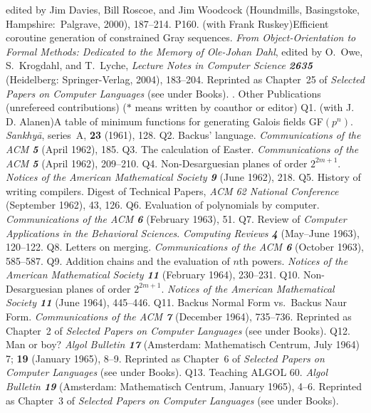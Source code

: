  edited by Jim Davies, Bill Roscoe, and Jim Woodcock (Houndmills, Basingstoke,
 Hampshire:\ Palgrave, 2000), 187--214.
\p P160. (with Frank Ruskey)\xskip Efficient coroutine generation of
 constrained Gray sequences. {\sl From Object-Orientation to Formal Methods:
 Dedicated to the Memory of Ole-Johan Dahl}, edited by O.~Owe, S.~Krogdahl,
 and T.~Lyche, {\sl Lecture Notes in Computer Science\/ \bf2635} (Heidelberg:
 Springer-Verlag, 2004), 183--204.
 Reprinted as Chapter~25 of {\sl Selected Papers on
 Computer Languages\/} (see under Books).
\finishpage
.  {Other Publications \rm(unrefereed contributions)
 ($\ast$ means written by coauthor or editor)}
\p *Q1.  (with J. D. Alanen)\xskip  A table of minimum functions for
 generating Galois fields GF$(p^n)$.  {\sl Sankhy\=a}, series~A,
 {\bf 23} (1961), 128.  
\p Q2.  Backus' language.  {\sl Commun\-i\-ca\-tions of the ACM\/ \bf 5}
 (April 1962), 185.
\p Q3.  The calculation of Easter.  {\sl Commun\-i\-ca\-tions of the ACM\/
 \bf 5} (April 1962), 209--210.  
\p Q4.  Non-Desarguesian planes of order $2^{2m+1}$.  {\sl Notices of the
 American Mathematical Society\/ \bf 9} (June 1962), 218.  
\p Q5.  History of writing compilers.  Digest of Technical Papers,
 {\sl ACM 62 National Conference\/} (September 1962), 43, 126.  
\p Q6.  Evaluation of polynomials by computer.
 {\sl Commun\-i\-ca\-tions of the ACM\/ \bf 6} (February 1963), 51.  
\p Q7.  Review of {\sl Computer Applications in the Behavioral Sciences}. 
 {\sl Computing Reviews\/ \bf 4} (May--June 1963), 120--122.  
\p Q8.  Letters on merging.  {\sl Commun\-i\-ca\-tions of the ACM\/ \bf 6}
 (October 1963), 585--587.  
\p Q9.  Addition chains and the evaluation of $n$th powers. 
 {\sl Notices of the American Mathematical Society\/ \bf 11} (February 1964),
 230--231.  
\p Q10.  Non-Desarguesian planes of order $2^{2m+1}$.  {\sl Notices of the
 American Mathematical Society\/ \bf 11} (June 1964), 445--446.
\p Q11.  Backus Normal Form vs.\ Backus Naur Form.  {\sl Commun\-i\-ca\-tions
 of the ACM\/ \bf 7} (December 1964), 735--736.  
 Reprinted as Chapter~2 of {\sl Selected Papers on
 Computer Languages\/} (see under Books).
\p Q12.  Man or boy?  {\sl Algol Bulletin\/ \bf 17} (Amsterdam: Mathematisch
 Centrum, July 1964) 7; {\bf 19} (January 1965), 8--9.  
 Reprinted as Chapter~6 of {\sl Selected Papers on
 Computer Languages\/} (see under Books).
\p Q13.  Teaching ALGOL 60.  {\sl Algol Bulletin\/ \bf 19}
 (Amsterdam: Mathematisch Centrum, January 1965), 4--6.  
 Reprinted as Chapter~3 of {\sl Selected Papers on
 Computer Languages\/} (see under Books).

